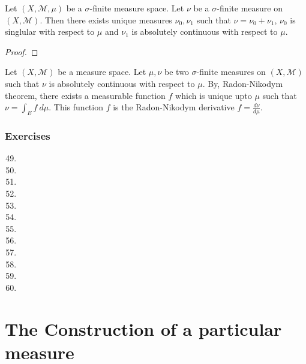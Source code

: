 \begin{theorem}
	Let $(X,\mathcal{M},\mu)$ be a $\sigma$-finite measure space.
	Let $\nu$ be a $\sigma$-finite measure on $(X,\mathcal{M})$.
	Then there exists unique measures $\nu_0,\nu_1$ such that $\nu = \nu_0 + \nu_1$, $\nu_0$ is singlular with respect to $\mu$ and $\nu_1$ is absolutely continuous with respect to $\mu$.
\end{theorem}
\begin{proof}
\end{proof}

\begin{definition}
	Let $(X,\mathcal{M})$ be a measure space.
	Let $\mu,\nu$ be two $\sigma$-finite measures on $(X,\mathcal{M})$ such that $\nu$ is absolutely continuous with respect to $\mu$.
	By, Radon-Nikodym theorem, there exists a measurable function $f$ which is unique upto $\mu$ such that $\nu = \int_E f \ d\mu$.
	This function $f$ is the Radon-Nikodym derivative $f = \frac{d\nu}{d\mu}$.
\end{definition}

\subsubsection{Exercises}
\begin{enumerate}
	\setcounter{enumi}{48}
	\item
	\item
	\item
	\item
	\item
	\item
	\item
	\item
	\item
	\item
	\item
	\item
\end{enumerate}


\setcounter{section}{19}
\section{The Construction of a particular measure}
